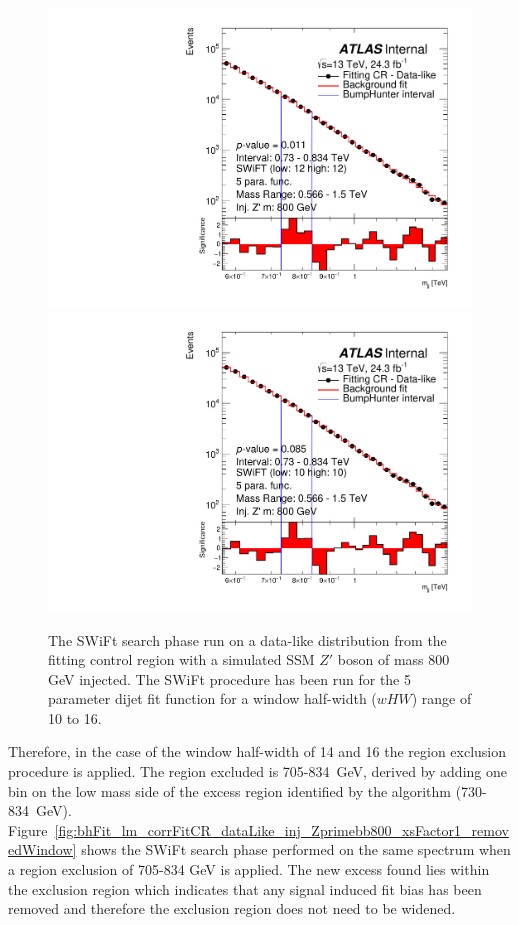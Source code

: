 \begin{figure}[!htb]
{  \includegraphics[width=0.45\linewidth, angle=0]{figs/Dibjet/LowMass/FitStudy_min566/bhFit_corrFitCR_dataLike_5para_low12_high12_inj_Zprimebb800_xsFactor1.pdf}
}
 {
  \includegraphics[width=0.45\linewidth, angle=0]{figs/Dibjet/LowMass/FitStudy_min566/bhFit_corrFitCR_dataLike_5para_low10_high10_inj_Zprimebb800_xsFactor1.pdf}
}

\caption{\label{fig:bhFit_lm_corrFitCR_dataLike_inj_Zprimebb800_xsFactor1}
  The SWiFt search phase run on a data-like distribution
  from the fitting control region with a simulated SSM $Z'$ boson of mass 800 GeV injected.
  The SWiFt procedure has been run for the 5 parameter dijet fit function for a window half-width ($wHW$) range of 10 to 16.
}
\end{figure}

Therefore, in the case of the window half-width of 14 and 16 the region exclusion procedure is applied.
The region excluded is 705-834~GeV, derived by adding one bin on the low mass side of the excess region identified by the \bh{} algorithm (730-834~GeV).
Figure~\ref{fig:bhFit_lm_corrFitCR_dataLike_inj_Zprimebb800_xsFactor1_removedWindow} shows the SWiFt search phase
performed on the same spectrum when a region exclusion of 705-834 GeV is applied.
The new excess found lies within the exclusion region which indicates that any signal induced fit bias has been removed
and therefore the exclusion region does not need to be widened.

